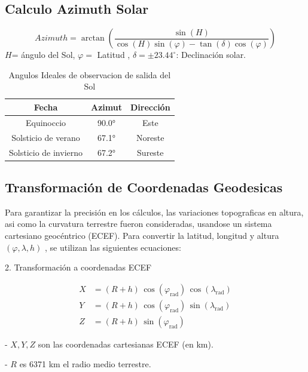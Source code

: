 \documentclass[a4paper,alpha-refs]{eSpectra}
\begin{document}
\subsection{Calculo Azimuth Solar}


\[Azimuth=\arctan \left(
\frac{\sin(H)}{\cos(H)\sin(\varphi) - \tan(\delta)\cos(\varphi)}
\right)\]
\noindent \(H\)= ángulo del Sol, \(\varphi =\) Latitud , \(\delta = \pm 23.44^\circ\): Declinación solar.

\begin{table}[h!]
\centering
\begin{tabular}{|c|c|c|}
\hline
\textbf{Fecha} & \textbf{Azimut}  & \textbf{Dirección} \\ \hline
Equinoccio & 90.0° & Este \\ \hline
Solsticio de verano & 67.1° & Noreste \\ \hline
Solsticio de invierno & 67.2° & Sureste \\ \hline
\end{tabular}
\caption{Angulos Ideales de observacion de salida del Sol}
\end{table}

\vspace{-\baselineskip}  %
\vspace{-1\baselineskip}  %

\subsection{Transformación de Coordenadas Geodesicas}
Para garantizar la precisión en los cálculos, las variaciones topograficas en altura, asi como la curvatura terrestre fueron consideradas, usandose un sistema cartesiano geocéntrico (ECEF). Para convertir la latitud, longitud y altura   \((\varphi, \lambda, h)\) , se utilizan las siguientes ecuaciones:

2. Transformación a coordenadas ECEF

\[
\begin{aligned}
X &= (R + h) \, \cos(\varphi_{\text{rad}}) \, \cos(\lambda_{\text{rad}}) \\
Y &= (R + h) \, \cos(\varphi_{\text{rad}}) \, \sin(\lambda_{\text{rad}}) \\
Z &= (R + h) \, \sin(\varphi_{\text{rad}})
\end{aligned}
\]

- \(X, Y, Z\) son las coordenadas cartesianas ECEF (en km).

- \(R\) es 6371 km el radio medio terrestre.
\end{document}
